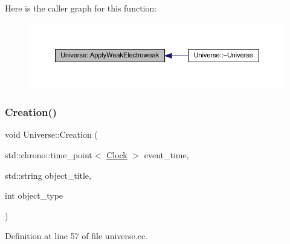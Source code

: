 Here is the caller graph for this function\+:
\nopagebreak
\begin{figure}[H]
\begin{center}
\leavevmode
\includegraphics[width=350pt]{class_universe_a46a906baabb63e5d31f8b48ea1fae52e_icgraph}
\end{center}
\end{figure}
\mbox{\label{class_universe_a28615baf47d4558cbe5eebeed6575024}} 
\subsubsection{\texorpdfstring{Creation()}{Creation()}}
{\footnotesize\ttfamily void Universe\+::\+Creation (\begin{DoxyParamCaption}\item[{std\+::chrono\+::time\+\_\+point$<$ \hyperlink{universe_8h_a0ef8d951d1ca5ab3cfaf7ab4c7a6fd80}{Clock} $>$}]{event\+\_\+time,  }\item[{std\+::string}]{object\+\_\+title,  }\item[{int}]{object\+\_\+type }\end{DoxyParamCaption})}



Definition at line 57 of file universe.\+cc.

